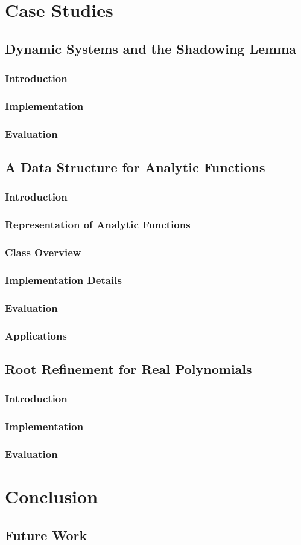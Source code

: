 \documentclass[tudarticle,type=msc,colorback,accentcolor=tud9c]{tudthesis}
\begin{document}
  \chapter{Case Studies}
  \section{Dynamic Systems and the Shadowing Lemma}
  \subsection{Introduction}
  \subsection{Implementation}
  \subsection{Evaluation}
  \section{A Data Structure for Analytic Functions}
  \subsection{Introduction}
  \subsection{Representation of Analytic Functions}
  \subsection{Class Overview}
  \subsection{Implementation Details}
  \subsection{Evaluation}
  \subsection{Applications}
  \section{Root Refinement for Real Polynomials}
  \subsection{Introduction}
  \subsection{Implementation}
  \subsection{Evaluation}
  \chapter{Conclusion}
  \section{Future Work}
\end{document}

